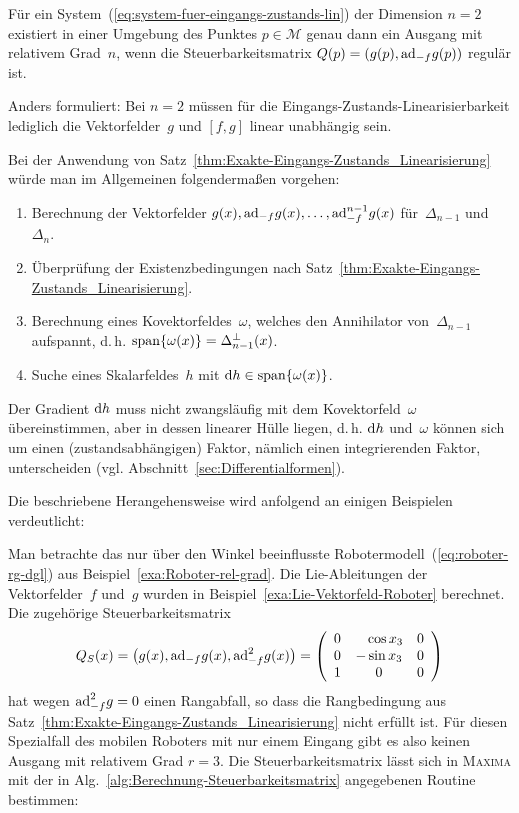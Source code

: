 \begin{corollary}
\label{kor:E-Z-Linearisierung-2-dim} Für ein System~(\ref{eq:system-fuer-eingangs-zustands-lin})
der Dimension $n=2$ existiert in einer Umgebung des Punktes $p\in\mathcal{M}$
genau dann ein Ausgang mit relativem Grad~$n$, wenn die Steuerbarkeitsmatrix
$Q(p)=(g(p),{\operatorname{ad}}_{-f}g(p))$ regulär ist. 
\end{corollary}
Anders formuliert: Bei $n=2$ müssen für die Eingangs-Zustands-Linearisierbarkeit
lediglich die Vektorfelder~$g$ und $[f,g]$ linear unabhängig sein.

\medskip{}

Bei der Anwendung von Satz~\ref{thm:Exakte-Eingangs-Zustands_Linearisierung}
würde man im Allgemeinen folgendermaßen vorgehen:
\begin{enumerate}
\item Berechnung der Vektorfelder $g(x),{\operatorname{ad}}_{-f}g(x),\ldots,{\operatorname{ad}}_{-f}^{n-1}g(x)$
für~$\Delta_{n-1}$ und~$\Delta_{n}$.
\item Überprüfung der Existenzbedingungen nach Satz~\ref{thm:Exakte-Eingangs-Zustands_Linearisierung}.
\item Berechnung eines Kovektorfeldes~$\omega$, welches den Annihilator
von~$\Delta_{n-1}$ aufspannt, d.\,h. ${\operatorname{span}}\{\omega(x)\}=\Delta_{n-1}^{\perp}(x)$.
\item Suche eines Skalarfeldes~$h$ mit ${\mathrm{d}} h\in{\operatorname{span}}\{\omega(x)\}$.
\end{enumerate}
Der Gradient ${\mathrm{d}} h$ muss nicht zwangsläufig mit dem Kovektorfeld~$\omega$
übereinstimmen, aber in dessen linearer Hülle liegen, d.\,h. ${\mathrm{d}} h$
und~$\omega$ können sich um einen (zustandsabhängigen) Faktor, nämlich
einen integrierenden Faktor, unterscheiden
(vgl. Abschnitt~\ref{sec:Differentialformen}). 

Die beschriebene Herangehensweise wird anfolgend an einigen Beispielen
verdeutlicht:

\begin{example}
\label{exa:Roboter-eingangs-zustands-linearisierung}Man betrachte
das nur über den Winkel beeinflusste Robotermodell~(\ref{eq:roboter-rg-dgl})
aus Beispiel~\ref{exa:Roboter-rel-grad}. Die Lie-Ableitungen der
Vektorfelder~$f$ und~$g$ wurden in Beispiel~\ref{exa:Lie-Vektorfeld-Roboter}
berechnet. Die zugehörige Steuerbarkeitsmatrix 
\[
Q_{S}(x)=\left(g(x),{\operatorname{ad}}_{-f}g(x),{\operatorname{ad}}_{-f}^{2}g(x)\right)=\left(\begin{array}{ccc}
0 & \phantom{-}\cos x_{3} & 0\\
0 & -\sin x_{3} & 0\\
1 & 0 & 0
\end{array}\right)
\]
hat wegen ${\operatorname{ad}}_{-f}^{2}g=0$ einen Rangabfall, so dass die Rangbedingung
aus Satz~\ref{thm:Exakte-Eingangs-Zustands_Linearisierung} nicht
erfüllt ist. Für diesen Spezialfall des mobilen Roboters mit nur einem
Eingang gibt es also keinen Ausgang mit relativem Grad $r=3$. Die
Steuerbarkeitsmatrix lässt sich in \textsc{Maxima} mit der in Alg.~\ref{alg:Berechnung-Steuerbarkeitsmatrix}
angegebenen Routine bestimmen:
\end{example}
\begin{maxima}\end{maxima}

